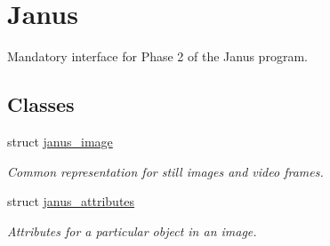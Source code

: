 \hypertarget{group__janus}{}\section{Janus}
\label{group__janus}


Mandatory interface for Phase 2 of the Janus program.  


\subsection*{Classes}
\begin{DoxyCompactItemize}
\item 
struct \hyperlink{structjanus__image}{janus\+\_\+image}
\begin{DoxyCompactList}\small\item\em Common representation for still images and video frames. \end{DoxyCompactList}\item 
struct \hyperlink{structjanus__attributes}{janus\+\_\+attributes}
\begin{DoxyCompactList}\small\item\em Attributes for a particular object in an image. \end{DoxyCompactList}\end{DoxyCompactItemize}
